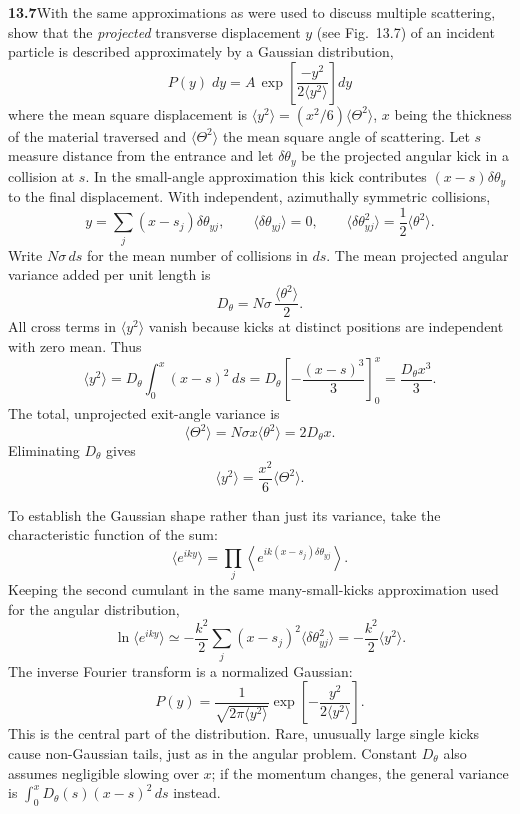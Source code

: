 \par\bigskip
\noindent\textbf{13.7}\quad With the same approximations as were used to discuss multiple scattering, show that the \emph{projected} transverse displacement $y$ (see Fig.~13.7) of an incident particle is described approximately by a Gaussian distribution,
\[
P(y)\;dy=A\,\exp\!\left[\frac{-y^{2}}{2\langle y^{2}\rangle}\right]dy
\]
where the mean square displacement is $\langle y^{2}\rangle=(x^{2}/6)\langle\Theta^{2}\rangle$, $x$ being the thickness of the material traversed and $\langle\Theta^{2}\rangle$ the mean square angle of scattering.
\solution
Let $s$ measure distance from the entrance and let
$\delta\theta_y$ be the projected angular kick in a collision at $s$.
In the small-angle approximation this kick contributes
$(x-s)\delta\theta_y$ to the final displacement. With independent,
azimuthally symmetric collisions,
\[
 y=\sum_j(x-s_j)\delta\theta_{yj},\qquad
 \langle\delta\theta_{yj}\rangle=0,\qquad
 \langle\delta\theta_{yj}^2\rangle=\frac12\langle\theta^2\rangle.
\]
Write $N\sigma\,ds$ for the mean number of collisions in $ds$.
The mean projected angular variance added per unit length is
\[
 D_\theta=N\sigma\,\frac{\langle\theta^2\rangle}{2}.
\]
All cross terms in $\langle y^2\rangle$ vanish because kicks at distinct
positions are independent with zero mean. Thus
\[
 \langle y^2\rangle
 =D_\theta\int_0^x(x-s)^2\,ds
 =D_\theta\left[-\frac{(x-s)^3}{3}\right]_0^x
 =\frac{D_\theta x^3}{3}.
\]
The total, unprojected exit-angle variance is
\[
 \langle\Theta^2\rangle=N\sigma x\langle\theta^2\rangle
 =2D_\theta x.
\]
Eliminating $D_\theta$ gives
\[
 \boxed{\langle y^2\rangle=\frac{x^2}{6}\langle\Theta^2\rangle.}
\]

To establish the Gaussian shape rather than just its variance, take the
characteristic function of the sum:
\[
 \langle e^{iky}\rangle
 =\prod_j\left\langle
     e^{ik(x-s_j)\delta\theta_{yj}}\right\rangle.
\]
Keeping the second cumulant in the same many-small-kicks approximation
used for the angular distribution,
\[
 \ln\langle e^{iky}\rangle
 \simeq-\frac{k^2}{2}
 \sum_j(x-s_j)^2\langle\delta\theta_{yj}^2\rangle
 =-\frac{k^2}{2}\langle y^2\rangle.
\]
The inverse Fourier transform is a normalized Gaussian:
\[
 \boxed{P(y)=\frac{1}{\sqrt{2\pi\langle y^2\rangle}}
       \exp\!\left[-\frac{y^2}{2\langle y^2\rangle}\right].}
\]
This is the central part of the distribution. Rare, unusually large
single kicks cause non-Gaussian tails, just as in the angular problem.
Constant $D_\theta$ also assumes negligible slowing over $x$; if the
momentum changes, the general variance is
$\int_0^x D_\theta(s)(x-s)^2\,ds$ instead.







